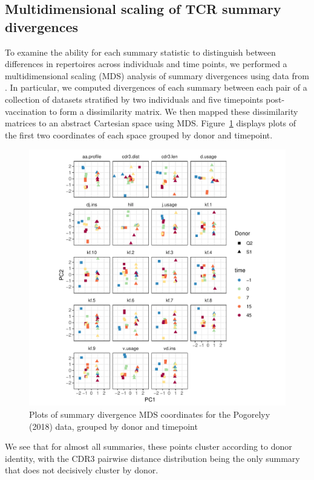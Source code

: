 \documentclass{article}
\begin{document}
\subsection*{Multidimensional scaling of TCR summary divergences}
To examine the ability for each summary statistic to distinguish between differences in repertoires across individuals and time points, we performed a multidimensional scaling (MDS) analysis of summary divergences using data from \cite{Pogorelyy2018-ak}.
In particular, we computed divergences of each summary between each pair of a collection of datasets stratified by two individuals and five timepoints post-vaccination to form a dissimilarity matrix.
We then mapped these dissimilarity matrices to an abstract Cartesian space using MDS.
Figure~\ref{fig:TCR_MDS} displays plots of the first two coordinates of each space grouped by donor and timepoint.
\begin{figure}
    \includegraphics[width=\linewidth]{Figures/tcr_pca.pdf}
    \caption{Plots of summary divergence MDS coordinates for the Pogorelyy (2018) data, grouped by donor and timepoint}
    \label{fig:TCR_MDS}
\end{figure}
We see that for almost all summaries, these points cluster according to donor identity, with the CDR3 pairwise distance distribution being the only summary that does not decisively cluster by donor.
\end{document}
